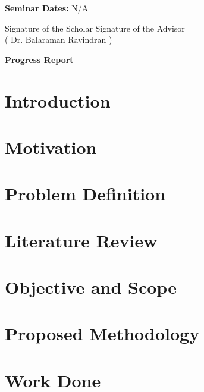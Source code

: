 \documentclass[12pt]{article}
\begin{document}
\textbf{Seminar Dates:} N/A


\vspace{2.5cm}
\begin{center}
Signature of the Scholar \hfill Signature of the Advisor \\
\hfill ( Dr. Balaraman Ravindran  )\\ \vspace{2cm}

\end{center}

\newpage
\begin{center}
\large \textbf{Progress Report}
\end{center}

\section{Introduction}
\label{intro}


\section{Motivation}
\label{motivation}


\section{Problem Definition}
\label{probDef}


\section{Literature Review}
\label{review}


\section{Objective and Scope}
\label{objective}


\section{Proposed Methodology}
\label{methodology}


\section{Work Done}
\label{workDone}

\end{document}
